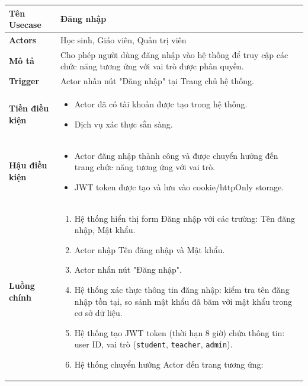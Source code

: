 \clearpage

\begin{longtable}{|p{}|p{}|}
\hline
\textbf{Tên Usecase} & \textbf{Đăng nhập} \\
\hline
\textbf{Actors} & Học sinh, Giáo viên, Quản trị viên \\
\hline
\textbf{Mô tả} & Cho phép người dùng đăng nhập vào hệ thống để truy cập các chức năng tương ứng với vai trò được phân quyền. \\
\hline
\textbf{Trigger} & Actor nhấn nút "Đăng nhập" tại Trang chủ hệ thống. \\
\hline
\textbf{Tiền điều kiện} & 
\vspace{-\baselineskip}
\begin{itemize}[topsep=2pt, itemsep=0pt]
    \item Actor đã có tài khoản được tạo trong hệ thống.
    \item Dịch vụ xác thực sẵn sàng.
\end{itemize} \\
\hline
\textbf{Hậu điều kiện} & 
\vspace{-\baselineskip}
\begin{itemize}[topsep=2pt, itemsep=0pt]
    \item Actor đăng nhập thành công và được chuyển hướng đến trang chức năng tương ứng với vai trò.
    \item JWT token được tạo và lưu vào cookie/httpOnly storage.
\end{itemize} \\
\hline
\textbf{Luồng chính} &
\vspace{-\baselineskip}
\begin{enumerate}[topsep=2pt, itemsep=0pt]
    \item Hệ thống hiển thị form Đăng nhập với các trường: Tên đăng nhập, Mật khẩu.
    \item Actor nhập Tên đăng nhập và Mật khẩu.
    \item Actor nhấn nút "Đăng nhập".
    \item Hệ thống xác thực thông tin đăng nhập: kiểm tra tên đăng nhập tồn tại, so sánh mật khẩu đã băm với mật khẩu trong cơ sở dữ liệu.
    \item Hệ thống tạo JWT token (thời hạn 8 giờ) chứa thông tin: user ID, vai trò (\texttt{student}, \texttt{teacher}, \texttt{admin}).
    \item Hệ thống chuyển hướng Actor đến trang tương ứng:
    \begin{itemize}[topsep=0pt, itemsep=0pt]

\end{itemize}
\end{enumerate}
\end{longtable}
